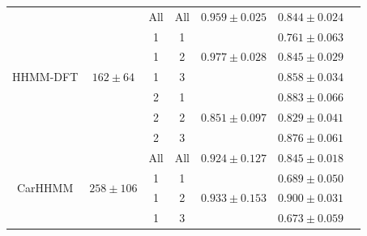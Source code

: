 \begin{table}[ht]
{\begin{tabular}{ccccccc}
\multirow{7}{*}{HHMM-DFT}   & \multirow{7}{*}{$162 \pm 64$}   & All                           & All                              & $0.959 \pm 0.025$                   & $0.844 \pm 0.024$                       \\
                            &                                    & 1                             & 1                                & \multirow{3}{*}{$0.977\pm0.028$}    & $0.761 \pm 0.063$                       \\ 
                            &                                    & 1                             & 2                                &                                   & $0.845 \pm 0.029$                       \\ 
                            &                                    & 1                             & 3                                &                                   & $0.858 \pm 0.034$                       \\
                            &                                    & 2                             & 1                                & \multirow{3}{*}{$0.851\pm0.097$}    & $0.883 \pm 0.066$                       \\ 
                            &                                    & 2                             & 2                                &                                   & $0.829 \pm 0.041$                       \\
                            &                                    & 2                             & 3                                &                                   & $0.876 \pm 0.061$                       \\ \hline
\multirow{7}{*}{CarHHMM}    & \multirow{7}{*}{$258 \pm 106$}   & All                           & All                              & $0.924 \pm 0.127$                   & $0.845 \pm 0.018$                       \\
                            &                                    & 1                             & 1                                & \multirow{3}{*}{$0.933\pm0.153$}    & $0.689 \pm 0.050$                       \\ 
                            &                                    & 1                             & 2                                &                                   & $0.900 \pm 0.031$                       \\ 
                            &                                    & 1                             & 3                                &                                   & $0.673 \pm 0.059$                       \\

\end{tabular}}
\end{table}
